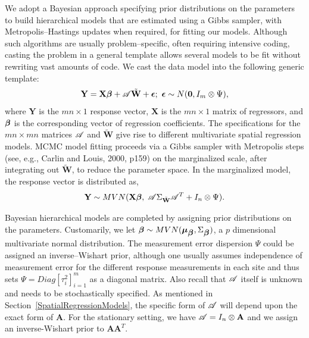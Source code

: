 \documentclass[a4paper]{article}
\newcommand{\bbeta}{ \mbox{\boldmath $ \beta $} }
\newcommand{\bepsilon}{ \mbox{\boldmath $\epsilon$}}
\newcommand{\bmu}{ \mbox{\boldmath $\mu$} }
\newcommand{\bzero}{\textbf{0}}
\newcommand{\bA}{\textbf{A}}
\newcommand{\bW}{\textbf{W}}
\newcommand{\bX}{\textbf{X}}
\newcommand{\bY}{\textbf{Y}}
\begin{document}
We adopt a Bayesian approach specifying prior distributions on the
parameters to build hierarchical models that are estimated using a
Gibbs sampler, with Metropolis--Hastings updates when required, for
fitting our models.
Although such algorithms are usually problem--specific, often
requiring intensive coding, casting the problem in a general
template allows several models to be fit without rewriting vast
amounts of code. We cast the data model into the following generic
template:
\begin{equation}
\bY = \bX\bbeta + {\cal A}\tilde{\bW} + \bepsilon;\text{ } \bepsilon
\sim N(\bzero,I_{m}\otimes \Psi),\label{GeneralDataEquation}
\end{equation}
where $\bY$ is the $mn\times 1$ response vector, $\bX$ is the
$mn\times 1$ matrix of regressors, and $\bbeta$ is the corresponding
vector of regression coefficients. The specifications for the
$mn\times mn$ matrices ${\cal A}$ and $\tilde{\bW}$ give rise to
different multivariate spatial regression models. MCMC model fitting proceeds via a Gibbs sampler
with Metropolis steps (see, e.g., Carlin and Louis, 2000, p159) on the
marginalized scale, after integrating out $\tilde{\bW}$, to reduce
the parameter space.  In the marginalized model, the response
vector is distributed as,
\begin{equation}\label{marginalizedLikelihood}
\bY \sim MVN(\bX\bbeta,\;{\cal A}\Sigma_{\tilde{\bW}}{\cal A}^{T}+I_n\otimes \Psi).
\end{equation}

Bayesian hierarchical models are completed by assigning prior
distributions on the parameters. Customarily, we let $\bbeta \sim
MVN(\bmu_{\bbeta},\Sigma_{\bbeta})$, a $p$ dimensional
multivariate normal distribution. The measurement error
dispersion $\Psi$ could be assigned an inverse--Wishart prior,
although one usually assumes independence of measurement error for
the different response measurements in each site and thus sets $\Psi =
Diag[\tau_i^2]_{i=1}^{m}$ as a diagonal matrix. Also recall that
${\cal A}$ itself is unknown and needs to be stochastically
specified. As mentioned in Section~\ref{SpatialRegressionModels},
the specific form of ${\cal A}$ will depend upon the exact form of
$\bA$. For the stationary setting, we have ${\cal A} = I_{n}\otimes
\bA$ and we assign an inverse-Wishart prior to $\bA\bA^{T}$. 
\end{document}
